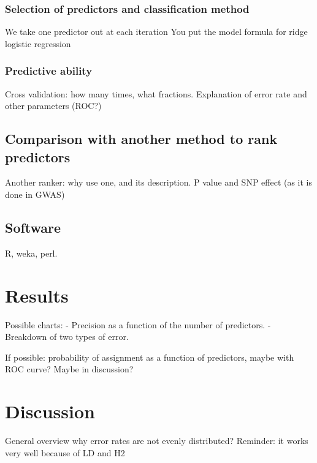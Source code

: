 \subsubsection{Selection of predictors and classification method}
\label{par:predictor_selection}
We take one predictor out at each iteration
You put the model formula for ridge logistic regression

\subsubsection{Predictive ability}
\label{par:estimating_error}
Cross validation: how many times, what fractions. 
Explanation of error rate and other parameters (ROC?)

\subsection{Comparison with another method to rank predictors}
\label{sec:other_ranker}
Another ranker: why use one, and its description.
P value and SNP effect (as it is done in GWAS)

\subsection{Software}
\label{sec:software}
R, weka, perl.

\section{Results}
\label{sec:results}
Possible charts:
- Precision as a function of the number of predictors.
- Breakdown of two types of error.

If possible: probability of assignment as a function of predictors, maybe
with ROC curve? Maybe in discussion?


\section{Discussion}
\label{sec:discussion}
General overview
why error rates are not evenly distributed?
Reminder: it works very well because of LD and H2

